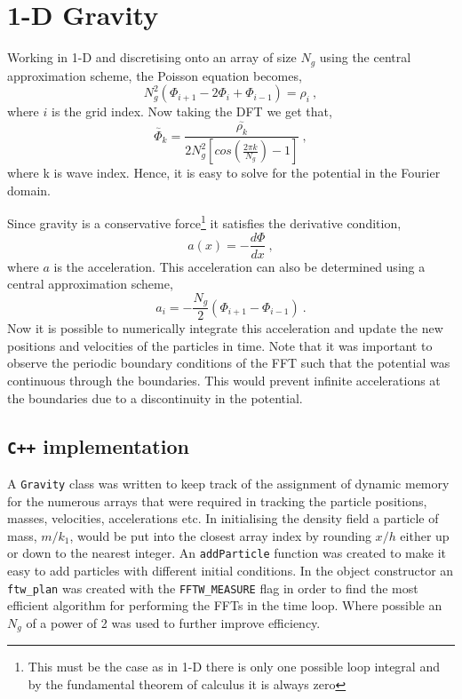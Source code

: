 \documentclass[10pt,a4paper]{article}
\begin{document}
\section{1-D Gravity}
Working in 1-D and discretising onto an array of size $N_g$ using the central approximation scheme, the Poisson equation becomes,
\begin{equation}
N_g^2\left(\Phi_{i+1}-2\Phi_{i}+\Phi_{i-1}\right) = \rho_i \:,
\end{equation}
where $i$ is the grid index. Now taking the DFT we get that,
\begin{equation}
\stackrel{{}_{\sim}\phantom{0}}{\Phi_k} = \frac{\stackrel{{}_{\sim}}{\rho_k}}{2N_g^2\left[cos\left(\frac{2\pi k}{N_g}\right)-1\right]}\:,
\end{equation}
where k is wave index. Hence, it is easy to solve for the potential in the Fourier domain.

Since gravity is a conservative force\footnote{This must be the case as in 1-D there is only one possible loop integral and by the fundamental theorem of calculus it is always zero} it satisfies the derivative condition,
\begin{equation}
a(x) = -\frac{d\Phi}{dx}\:,
\end{equation}
where $a$ is the acceleration. This acceleration can also be determined using a central approximation scheme,
\begin{equation}
a_i = -\frac{N_g}{2}\left(\Phi_{i+1}-\Phi_{i-1}\right) \:.
\end{equation}
Now it is possible to numerically integrate this acceleration and update the new positions and velocities of the particles in time. Note that it was important to observe the periodic boundary conditions of the FFT such that the potential was continuous through the boundaries. This would prevent infinite accelerations at the boundaries due to a discontinuity in the potential.

\subsection{\texttt{C++} implementation}

A \texttt{Gravity} class was written to keep track of the assignment of dynamic memory for the numerous arrays that were required in tracking the particle positions, masses, velocities, accelerations etc. In initialising the density field a particle of mass, $m/k_1$, would be put into the closest array index by rounding $x/h$ either up or down to the nearest integer. An \texttt{addParticle} function was created to make it easy to add particles with different initial conditions. In the object constructor an \texttt{ftw\_plan} was created with the \texttt{FFTW\_MEASURE} flag in order to find the most efficient algorithm for performing the FFTs in the time loop. Where possible an $N_g$ of a power of 2 was  used to further improve efficiency.
\end{document}
